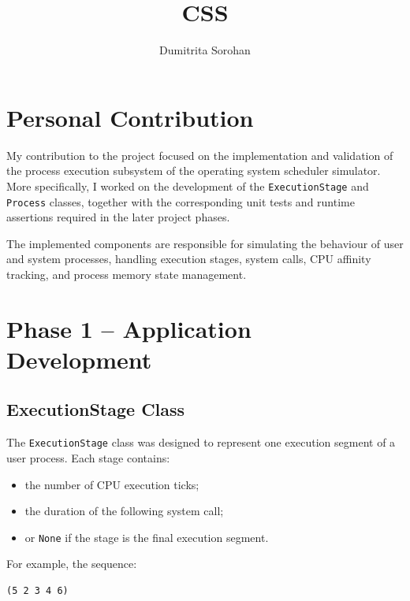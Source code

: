 \documentclass{article}
\title{CSS}
\author{Dumitrita Sorohan}
\date{}
\begin{document}
\maketitle

\begin{abstract}

\end{abstract}

\section{Personal Contribution}

My contribution to the project focused on the implementation and validation of the process execution subsystem of the operating system scheduler simulator.  
More specifically, I worked on the development of the \texttt{ExecutionStage} and \texttt{Process} classes, together with the corresponding unit tests and runtime assertions required in the later project phases.

The implemented components are responsible for simulating the behaviour of user and system processes, handling execution stages, system calls, CPU affinity tracking, and process memory state management.


\section{Phase 1 -- Application Development}

\subsection{ExecutionStage Class}

The \texttt{ExecutionStage} class was designed to represent one execution segment of a user process.  
Each stage contains:

\begin{itemize}
    \item the number of CPU execution ticks;
    \item the duration of the following system call;
    \item or \texttt{None} if the stage is the final execution segment.
\end{itemize}

For example, the sequence:

\begin{verbatim}
(5 2 3 4 6)
\end{verbatim}
\end{document}
